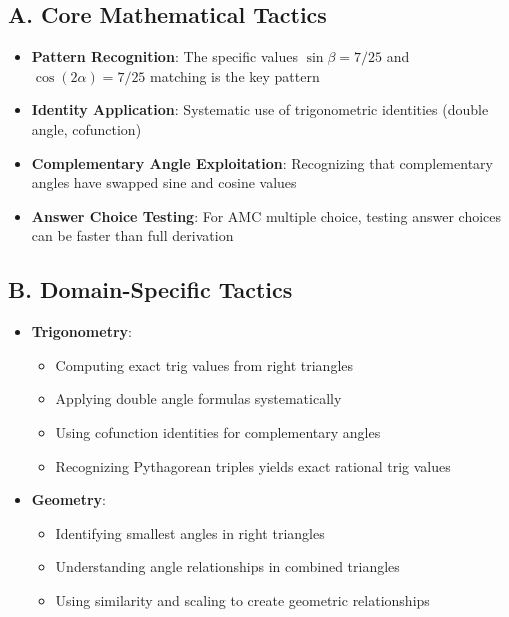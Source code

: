 \documentclass[11pt]{article}
\begin{document}
\begin{tacticalbox}
\subsection*{A. Core Mathematical Tactics}
\begin{itemize}[leftmargin=*]
    \item \textbf{Pattern Recognition}: The specific values $\sin\beta = 7/25$ and $\cos(2\alpha) = 7/25$ matching is the key pattern
    
    \item \textbf{Identity Application}: Systematic use of trigonometric identities (double angle, cofunction)
    
    \item \textbf{Complementary Angle Exploitation}: Recognizing that complementary angles have swapped sine and cosine values
    
    \item \textbf{Answer Choice Testing}: For AMC multiple choice, testing answer choices can be faster than full derivation
\end{itemize}

\subsection*{B. Domain-Specific Tactics}
\begin{itemize}[leftmargin=*]
    \item \textbf{Trigonometry}: 
    \begin{itemize}
        \item Computing exact trig values from right triangles
        \item Applying double angle formulas systematically
        \item Using cofunction identities for complementary angles
        \item Recognizing Pythagorean triples yields exact rational trig values
    \end{itemize}
    
    \item \textbf{Geometry}: 
    \begin{itemize}
        \item Identifying smallest angles in right triangles
        \item Understanding angle relationships in combined triangles
        \item Using similarity and scaling to create geometric relationships
    \end{itemize}
    

\end{itemize}
\end{tacticalbox}
\end{document}
